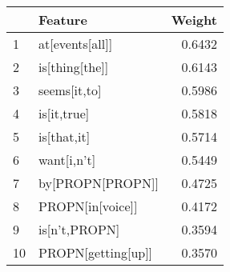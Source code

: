 \begin{tabular}{llr}
\toprule
{} &             Feature &  Weight \\
\midrule
1  &     at[events[all]] &  0.6432 \\
2  &      is[thing[the]] &  0.6143 \\
3  &        seems[it,to] &  0.5986 \\
4  &         is[it,true] &  0.5818 \\
5  &         is[that,it] &  0.5714 \\
6  &         want[i,n't] &  0.5449 \\
7  &    by[PROPN[PROPN]] &  0.4725 \\
8  &    PROPN[in[voice]] &  0.4172 \\
9  &       is[n't,PROPN] &  0.3594 \\
10 &  PROPN[getting[up]] &  0.3570 \\
\bottomrule
\end{tabular}
